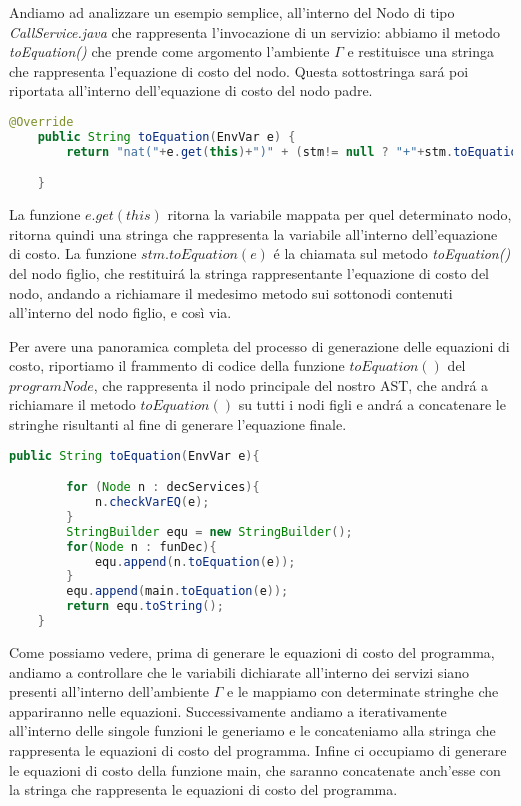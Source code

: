 \documentclass[../../main.tex]{subfiles}
\begin{document}
Andiamo ad analizzare un esempio semplice, all'interno del Nodo di tipo \textit{CallService.java} che rappresenta l'invocazione di un servizio: abbiamo il metodo \textit{toEquation()} che prende come argomento l'ambiente $\varGamma$ e restituisce una stringa che rappresenta l'equazione di costo del nodo. Questa sottostringa sará poi riportata all'interno dell'equazione di costo del nodo padre.

\begin{lstlisting}[language=Java]
    @Override
    public String toEquation(EnvVar e) {
        return "nat("+e.get(this)+")" + (stm!= null ? "+"+stm.toEquation(e) : "");

    }
\end{lstlisting}

La funzione $e.get(this)$ ritorna la variabile mappata per quel determinato nodo, ritorna quindi una stringa che rappresenta la variabile all'interno dell'equazione di costo. La funzione $stm.toEquation(e)$ é la chiamata sul metodo \textit{toEquation()} del nodo figlio, che restituirá la stringa rappresentante l'equazione di costo del nodo, andando a richiamare il medesimo metodo sui sottonodi contenuti all'interno del nodo figlio, e così via.

Per avere una panoramica completa del processo di generazione delle equazioni di costo, riportiamo il frammento di codice della funzione $toEquation()$ del $programNode$, che rappresenta il nodo principale del nostro AST, che andrá a richiamare il metodo $toEquation()$ su tutti i nodi figli e andrá a concatenare le stringhe risultanti al fine di generare l'equazione finale.
\begin{lstlisting}[language=Java, caption={toEquation() del ProgramNode}]
    public String toEquation(EnvVar e){

        for (Node n : decServices){
            n.checkVarEQ(e);
        }
        StringBuilder equ = new StringBuilder();
        for(Node n : funDec){
            equ.append(n.toEquation(e));
        }
        equ.append(main.toEquation(e));
        return equ.toString();
    }
\end{lstlisting}

Come possiamo vedere, prima di generare le equazioni di costo del programma, andiamo a controllare che le variabili dichiarate all'interno dei servizi siano presenti all'interno dell'ambiente $\varGamma$ e le mappiamo con determinate stringhe che appariranno nelle equazioni. Successivamente andiamo a iterativamente all'interno delle singole funzioni le generiamo e le concateniamo alla stringa che rappresenta le equazioni di costo del programma.
Infine ci occupiamo di generare le equazioni di costo della funzione main, che saranno concatenate anch'esse con la stringa che rappresenta le equazioni di costo del programma.
\end{document}

